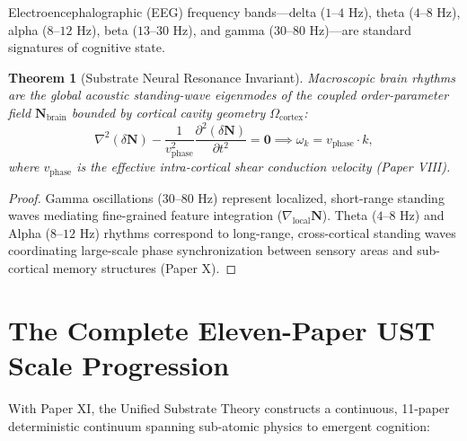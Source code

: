 \documentclass[11pt,a4paper]{article}
\newtheorem{thm}{Theorem}
\begin{document}
	Electroencephalographic (EEG) frequency bands—delta ($1$--$4 \text{ Hz}$), theta ($4$--$8 \text{ Hz}$), alpha ($8$--$12 \text{ Hz}$), beta ($13$--$30 \text{ Hz}$), and gamma ($30$--$80 \text{ Hz}$)—are standard signatures of cognitive state.
	
	\begin{thm}[Substrate Neural Resonance Invariant]
		\label{thm:eeg_resonances}
		Macroscopic brain rhythms are the global acoustic standing-wave eigenmodes of the coupled order-parameter field $\mathbf{N}_{\text{brain}}$ bounded by cortical cavity geometry $\Omega_{\text{cortex}}$:
		\begin{equation}
			\nabla^2 (\delta \mathbf{N}) - \frac{1}{v_{\text{phase}}^2} \frac{\partial^2 (\delta \mathbf{N})}{\partial t^2} = \mathbf{0} \implies \omega_k = v_{\text{phase}} \cdot k,
			\label{eq:eeg_standing_wave_pde}
		\end{equation}
		where $v_{\text{phase}}$ is the effective intra-cortical shear conduction velocity (Paper VIII).
	\end{thm}
	
	\begin{proof}
		Gamma oscillations ($30$--$80 \text{ Hz}$) represent localized, short-range standing waves mediating fine-grained feature integration ($\nabla_{\text{local}} \mathbf{N}$). Theta ($4$--$8 \text{ Hz}$) and Alpha ($8$--$12 \text{ Hz}$) rhythms correspond to long-range, cross-cortical standing waves coordinating large-scale phase synchronization between sensory areas and sub-cortical memory structures (Paper X).
	\end{proof}
	
	\section{The Complete Eleven-Paper UST Scale Progression}
	\label{sec:eleven_paper_synthesis}
	
	With Paper XI, the Unified Substrate Theory constructs a continuous, 11-paper deterministic continuum spanning sub-atomic physics to emergent cognition:
	
\end{document}
